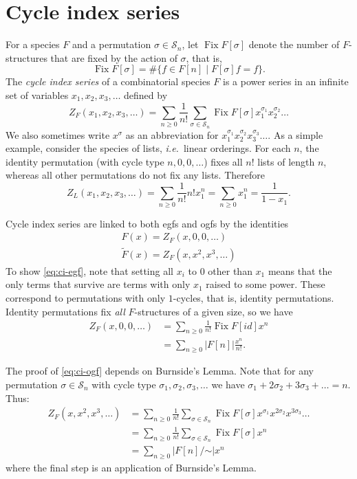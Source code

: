 \documentclass{article}
\newcommand{\ie}{\emph{i.e.}\ }
\renewcommand{\S}{\mathcal{S}}
\DeclareMathOperator{\Fix}{Fix}
\begin{document}
\section{Cycle index series}
\label{sec:cycle-inde}

For a species $F$ and a permutation $\sigma \in \S_n$, let $\Fix
F[\sigma]$ denote the number of $F$-structures that are fixed by the
action of $\sigma$, that is, \[ \Fix F[\sigma] = \#\{ f \in F[n] \mid
F[\sigma] f = f \}. \] The \emph{cycle index series} of a
combinatorial species $F$ is a power series in an infinite set of
variables $x_1, x_2, x_3, \dots$ defined by \[ Z_F(x_1, x_2, x_3,
\dots) = \sum_{n \geq 0} \frac{1}{n!}  \sum_{\sigma \in \S_n} \Fix
F[\sigma] x_1^{\sigma_1} x_2^{\sigma_2} \dots \] We also sometimes
write $x^\sigma$ as an abbreviation for $x_1^{\sigma_1} x_2^{\sigma_2}
x_3^{\sigma_3} \dots$. As a simple example, consider the species of
lists, \ie linear orderings.  For each $n$, the identity permutation
(with cycle type $n,0,0,\dots$) fixes all $n!$ lists of length $n$,
whereas all other permutations do not fix any lists.  Therefore \[
Z_L(x_1, x_2, x_3, \dots) = \sum_{n \geq 0} \frac{1}{n!}  n! x_1^n =
\sum_{n \geq 0} x_1^n = \frac{1}{1 - x_1}. \]

Cycle index series are linked to both egfs and ogfs by the identities
\begin{gather}
  F(x) = Z_F(x,0,0,\dots) \label{eq:ci-egf} \\
  \tilde F(x) = Z_F(x,x^2,x^3, \dots) \label{eq:ci-ogf}
\end{gather}
To show \eqref{eq:ci-egf}, note that setting all $x_i$ to $0$ other
than $x_1$ means that the only terms that survive are terms with only
$x_1$ raised to some power.  These correspond to permutations with
only $1$-cycles, that is, identity permutations.  Identity
permutations fix \emph{all} $F$-structures of a given size, so we have
\begin{align*}
  Z_F(x,0,0,\dots) &= \sum_{n \geq 0} \frac{1}{n!} \Fix F[\mathit{id}]
  x^n \\
  &= \sum_{n \geq 0} |F[n]| \frac{x^n}{n!}.
\end{align*}

The proof of \eqref{eq:ci-ogf} depends on Burnside's Lemma.  Note that
for any permutation $\sigma \in \S_n$ with cycle type
$\sigma_1,\sigma_2,\sigma_3,\dots$ we have $\sigma_1 + 2\sigma_2 +
3\sigma_3 + \dots = n$.  Thus:
\begin{align*}
  Z_F(x,x^2,x^3,\dots) &= \sum_{n \geq 0} \frac{1}{n!} \sum_{\sigma
    \in \S_n} \Fix F[\sigma]
  x^{\sigma_1}x^{2\sigma_2}x^{3\sigma_3}\dots \\
  &= \sum_{n \geq 0} \frac{1}{n!} \sum_{\sigma \in \S_n} \Fix
  F[\sigma] x^n \\
  &= \sum_{n \geq 0} |F[n]/\mathord{\sim}| x^n
\end{align*}
where the final step is an application of Burnside's Lemma.
\end{document}
